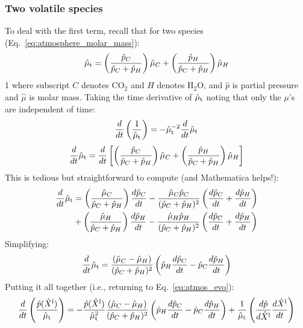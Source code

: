 \subsubsection{Two volatile species}
To deal with the first term, recall that for two species (Eq.~\ref{eq:atmosphere_molar_mass}):
\begin{equation}
\hat{\mu}_{\rm t} = \left( \frac{\hat{p}_C}{\hat{p}_C+\hat{p}_H} \right) \hat{\mu}_C + \left( \frac{\hat{p}_H}{\hat{p}_C+\hat{p}_H} \right) \hat{\mu}_H
\end{equation}1
where subscript $C$ denotes CO$_2$ and $H$ denotes H$_2$O, and $\hat{p}$ is partial pressure and $\hat{\mu}$ is molar mass.  Taking the time derivative of $\hat{\mu}_{\rm t}$ noting that only the $\mu$'s are independent of time:
\begin{equation}
\frac{d}{dt} \left( \frac{1}{\hat{\mu}_{\rm t}} \right) = -\hat{\mu}_{\rm t}^{-2} \frac{d}{dt} \hat{\mu}_{\rm t}
\end{equation}
\begin{equation}
\frac{d}{dt} \hat{\mu}_{\rm t} = \frac{d}{dt} \left[ \left( \frac{\hat{p}_C}{\hat{p}_C+\hat{p}_H} \right) \hat{\mu}_C + \left( \frac{\hat{p}_H}{\hat{p}_C+\hat{p}_H} \right) \hat{\mu}_H \right]
\end{equation}
This is tedious but straightforward to compute (and Mathematica helps!):
\begin{align}
\frac{d}{dt} \hat{\mu}_{\rm t} &= \left( \frac{\hat{\mu}_C}{\hat{p}_C+\hat{p}_H} \right) \frac{d\hat{p}_C}{dt} - \frac{\hat{\mu}_C \hat{p}_C}{(\hat{p}_C+\hat{p}_H)^2} \left( \frac{d\hat{p}_C}{dt}+\frac{d\hat{p}_H}{dt} \right)\\
&+ \left( \frac{\hat{\mu}_H}{\hat{p}_C+\hat{p}_H} \right) \frac{d\hat{p}_H}{dt} - \frac{\hat{\mu}_H \hat{p}_H}{(\hat{p}_C+\hat{p}_H)^2} \left( \frac{d\hat{p}_C}{dt}+\frac{d\hat{p}_H}{dt} \right)
\end{align}
Simplifying:
\begin{equation}
\frac{d}{dt} \hat{\mu}_{\rm t} = \frac{(\hat{\mu}_C-\hat{\mu}_H)}{(\hat{p}_C+\hat{p}_H)^2} \left( \hat{p}_H \frac{d\hat{p}_C}{dt} - \hat{p}_C \frac{d\hat{p}_H}{dt} \right)
\end{equation}
Putting it all together (i.e., returning to Eq.~\ref{eq:atmos_evo}):
\begin{equation}
\frac{d}{dt} \left( \frac{\hat{p}(\hat{X}^{\rm l})}{\hat{\mu}_{\rm t}} \right) = -\frac{\hat{p}(\hat{X}^{\rm l})}{\hat{\mu}_{\rm t}^2} \frac{(\hat{\mu}_C-\hat{\mu}_H)}{(\hat{p}_C+\hat{p}_H)^2} \left( \hat{p}_H \frac{d\hat{p}_C}{dt} - \hat{p}_C \frac{d\hat{p}_H}{dt} \right) + \frac{1}{\hat{\mu}_{\rm t}} \left( \frac{d \hat{p}}{d \hat{X}^{\rm l}} \frac{d \hat{X}^{\rm l}}{d t} \right)
\end{equation}

